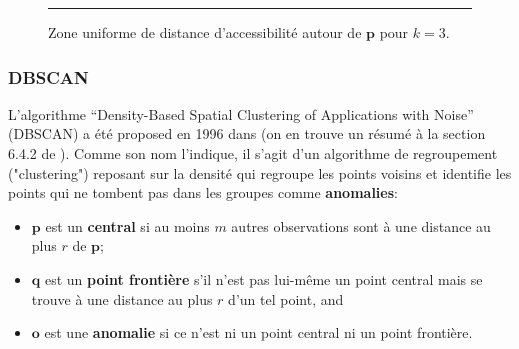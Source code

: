 \begin{figure}[H]
\hrule \vspace{0.4cm} \centering
{}
\caption{Zone uniforme de distance d'accessibilit\'e autour de $\mathbf{p}$ pour $k=3$.}
\label{reachability}
\end{figure}
\newpage\noindent  

\subsubsection*{DBSCAN}
L'algorithme ``Density-Based Spatial Clustering of Applications with Noise'' (DBSCAN) a \'et\'e proposed en 1996 dans \cite{DBSCAN} (on en trouve un r\'esum\'e \`a la section 6.4.2 de \cite{A10}). Comme son nom l'indique, il s'agit d'un algorithme de regroupement ("clustering") reposant sur la densité qui regroupe les points voisins et identifie les points qui ne tombent pas dans les groupes comme  \textbf{anomalies}:
 \begin{itemize}[noitemsep]
\item $\mathbf{p}$ est un \textbf{central} si au moins $m$ autres observations sont \`a une distance au plus $r$ de $\mathbf{p}$;
\item $\mathbf{q}$ est un \textbf{point frontière} s'il n'est pas lui-même un point central mais se trouve à une distance au plus $r$ d'un tel point, and 
\item $\mathbf{o}$ est une \textbf{anomalie} si ce n'est ni un point central ni un point frontière.
\end{itemize}

